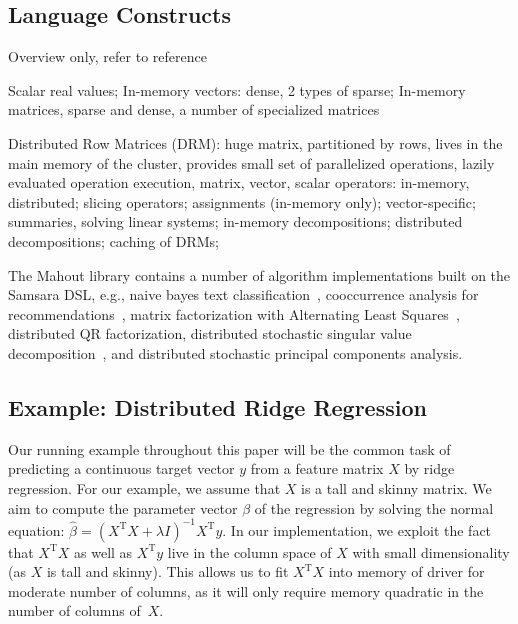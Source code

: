 \documentclass{article}
\begin{document}
\subsection{Language Constructs}

Overview only, refer to reference~\cite{Lyubimov2016}

Scalar real values; In-memory vectors: dense, 2 types of sparse; In-memory matrices, sparse and dense, a number of specialized matrices

Distributed Row Matrices (DRM): huge matrix, partitioned by rows, lives in the main memory of the cluster, provides small set of parallelized operations, lazily evaluated operation execution, matrix, vector, scalar operators: in-memory, distributed; slicing operators; assignments (in-memory only); vector-specific; summaries, solving linear systems; in-memory decompositions; distributed decompositions; caching of DRMs;

The Mahout library contains a number of algorithm implementations built on the Samsara DSL, e.g., naive bayes text classification~\cite{Rennie2003}, cooccurrence analysis for recommendations~\cite{Schelter2012,Dunning2014}, matrix factorization with Alternating Least Squares~\cite{Zhou2008}, distributed QR factorization, distributed stochastic singular value decomposition~\cite{Halko2012}, and distributed stochastic principal components analysis.

\subsection{Example: Distributed Ridge Regression}

Our running example throughout this paper will be the common task of predicting a continuous target vector $y$ from a feature matrix $X$ by ridge regression. For our example, we assume that $X$ is a tall and skinny matrix. We aim to compute the parameter vector $\beta$ of the regression by solving the normal equation: $\hat{\beta} = (X^\mathrm{T}X + \lambda I)^{-1} X^\mathrm{T}y$. In our implementation, we exploit the fact that $X^\mathrm{T} X$ as well as $X^\mathrm{T} y$ live in the column space of $X$ with small dimensionality (as $X$ is tall and skinny). This allows us to fit $X^\mathrm{T} X$ into memory of driver for moderate number of columns, as it will only require memory quadratic in the number of columns of~$X$.
\end{document}
